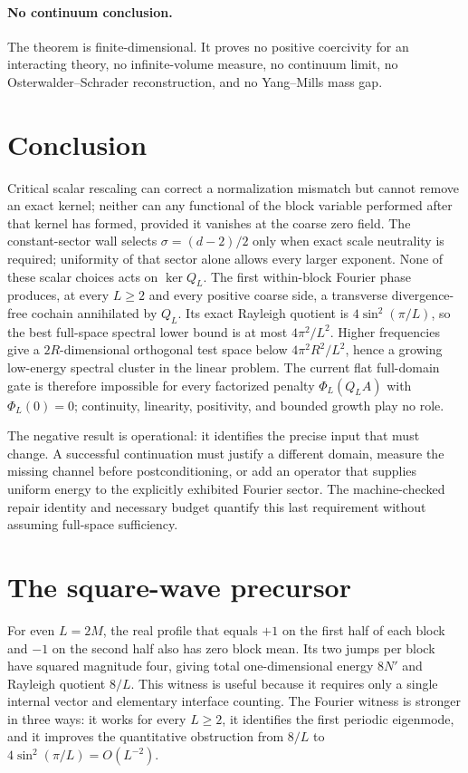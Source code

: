 \documentclass[11pt]{article}
\theoremstyle{definition}
\begin{document}
\paragraph{No continuum conclusion.}
The theorem is finite-dimensional.  It proves no positive coercivity for an
interacting theory, no infinite-volume measure, no continuum limit, no
Osterwalder--Schrader reconstruction, and no Yang--Mills mass gap.

\section{Conclusion}

Critical scalar rescaling can correct a normalization mismatch but cannot
remove an exact kernel; neither can any functional of the block variable
performed after that kernel has formed, provided it vanishes at the coarse
zero field.  The constant-sector wall selects
$\sigma=(d-2)/2$ only when exact scale neutrality is required; uniformity of
that sector alone allows every larger exponent.  None of these scalar choices
acts on $\ker Q_L$.  The first within-block Fourier phase produces, at
every $L\ge2$ and every positive coarse side, a transverse divergence-free
cochain annihilated by $Q_L$.  Its exact Rayleigh quotient is
$4\sin^2(\pi/L)$, so the best full-space spectral lower bound is at most
$4\pi^2/L^2$.  Higher frequencies give a $2R$-dimensional orthogonal test
space below $4\pi^2R^2/L^2$, hence a growing low-energy spectral cluster in
the linear problem.  The current flat full-domain gate is therefore
impossible for every factorized penalty $\Phi_L(Q_LA)$ with $\Phi_L(0)=0$;
continuity, linearity, positivity, and bounded growth play no role.

The negative result is operational: it identifies the precise input that
must change.  A successful continuation must justify a different domain,
measure the missing channel before postconditioning, or add an operator that
supplies uniform energy to the explicitly exhibited Fourier sector.  The
machine-checked repair identity and necessary budget quantify this last
requirement without assuming full-space sufficiency.

\appendix
\section{The square-wave precursor}

For even $L=2M$, the real profile that equals $+1$ on the first half of each
block and $-1$ on the second half also has zero block mean.  Its two jumps per
block have squared magnitude four, giving total one-dimensional energy
$8N'$ and Rayleigh quotient $8/L$.  This witness is useful because it requires
only a single internal vector and elementary interface counting.  The Fourier
witness is stronger in three ways: it works for every $L\ge2$, it identifies
the first periodic eigenmode, and it improves the quantitative obstruction
from $8/L$ to $4\sin^2(\pi/L)=O(L^{-2})$.
\end{document}
